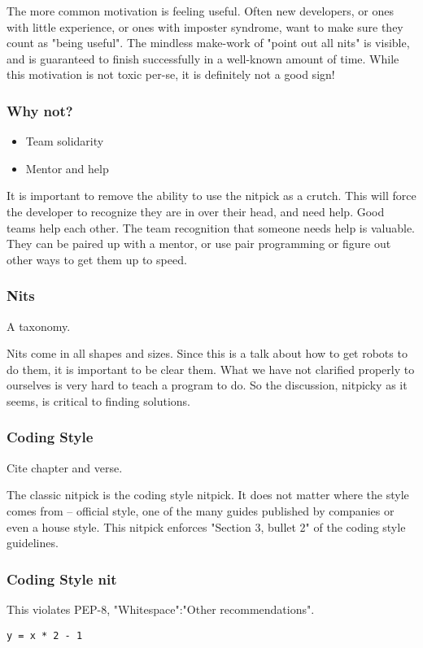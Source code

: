 The more common motivation is feeling useful.
Often new developers,
or ones with little experience,
or ones with imposter syndrome,
want to make sure they count as "being useful".
The mindless make-work of "point out all nits"
is visible,
and is guaranteed to finish successfully in a well-known amount of time.
While this motivation is not toxic per-se,
it is definitely not a good sign!

\begin{frame}
\frametitle{Why not?}
\begin{itemize}
\item Team solidarity
\item Mentor and help
\end{itemize}
\end{frame}

It is important to remove the ability to use the nitpick as a crutch.
This will force the developer to recognize they are in over their head,
and need help.
Good teams help each other.
The team recognition that someone needs help is valuable.
They can be paired up with a mentor,
or use pair programming
or figure out other ways to get them up to speed.

\begin{frame}
\frametitle{Nits}
A taxonomy.
\end{frame}

Nits come in all shapes and sizes.
Since this is a talk about how to get robots to do them,
it is important to be clear them.
What we have not clarified properly to ourselves
is very hard to teach a program to do.
So the discussion,
nitpicky as it seems,
is critical to finding solutions.

\begin{frame}
\frametitle{Coding Style}
Cite chapter and verse.

\end{frame}

The classic nitpick is the coding style nitpick.
It does not matter where the style comes from --
official style,
one of the many guides published by companies
or even a house style.
This nitpick enforces "Section 3, bullet 2"
of the coding style guidelines.

\begin{frame}[fragile]
\frametitle{Coding Style nit}
This violates PEP-8, "Whitespace":"Other recommendations".

\begin{lstlisting}
y = x * 2 - 1
\end{lstlisting}
\end{frame}

